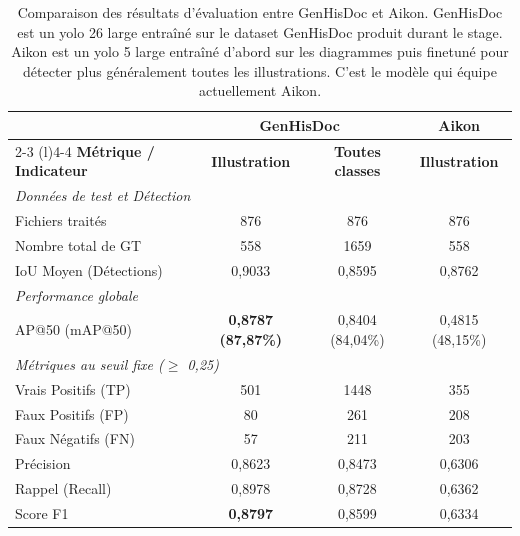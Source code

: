 \begin{table}[htbp]
	\centering
	\caption{Comparaison des résultats d'évaluation entre GenHisDoc et Aikon. GenHisDoc est un yolo 26 large entraîné sur le dataset GenHisDoc produit durant le stage. Aikon est un yolo 5 large entraîné d'abord sur les diagrammes puis finetuné pour détecter plus généralement toutes les illustrations. C'est le modèle qui équipe actuellement Aikon.}
	\begin{tabular}{lccc}
		\toprule
		& \multicolumn{2}{c}{\textbf{GenHisDoc}} & \textbf{Aikon} \\
		\cmidrule(r){2-3} \cmidrule(l){4-4}
		\textbf{Métrique / Indicateur} & \textbf{Illustration} & \textbf{Toutes classes} & \textbf{Illustration} \\
		\midrule
		\multicolumn{4}{l}{\textit{Données de test et Détection}} \\
		\hspace{1em} Fichiers traités & 876 & 876 & 876 \\
		\hspace{1em} Nombre total de GT & 558 & 1659 & 558 \\
		\hspace{1em} IoU Moyen (Détections) & 0,9033 & 0,8595 & 0,8762 \\
		\midrule
		\multicolumn{4}{l}{\textit{Performance globale}} \\
		\hspace{1em} AP@50 (mAP@50) & \textbf{ 0,8787 (87,87\%)} & 0,8404 (84,04\%) & 0,4815 (48,15\%) \\
		\midrule
		\multicolumn{4}{l}{\textit{Métriques au seuil fixe ($\ge$ 0,25)}} \\
		\hspace{1em} Vrais Positifs (TP) & 501 & 1448 & 355 \\
		\hspace{1em} Faux Positifs (FP) & 80 & 261 & 208 \\
		\hspace{1em} Faux Négatifs (FN) & 57 & 211 & 203 \\
		\hspace{1em} Précision & 0,8623 & 0,8473 & 0,6306 \\
		\hspace{1em} Rappel (Recall) & 0,8978 & 0,8728 & 0,6362 \\
		\hspace{1em} Score F1 & \textbf{0,8797} & 0,8599 & 0,6334 \\
		\bottomrule
	\end{tabular}
	\label{tab:GenHisDocYolo}
\end{table}
